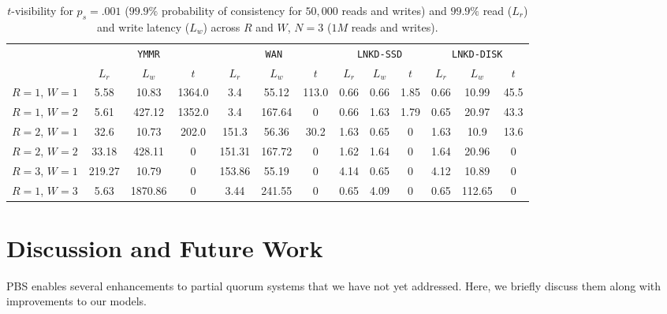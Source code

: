 \documentclass{vldb}
\begin{document}
\begin{table}
\centering
\begin{tabular}{c|c|c|c|c|c|c|c|c|c|c|c|c|}
\cline{2-13}
& \multicolumn{3}{|c|}{\texttt{YMMR}} & \multicolumn{3}{|c|}{\texttt{WAN}} & \multicolumn{3}{|c|}{\texttt{LNKD-SSD}} & \multicolumn{3}{|c|}{\texttt{LNKD-DISK}}\\
&\multicolumn{1}{|c}{$L_r$}  & \multicolumn{1}{c}{$L_w$} & \multicolumn{1}{c|}{$t$} &  \multicolumn{1}{|c}{$L_r$} & \multicolumn{1}{c}{$L_w$} & \multicolumn{1}{c|}{$t$} &  \multicolumn{1}{|c}{$L_r$} & \multicolumn{1}{c}{$L_w$} & \multicolumn{1}{c|}{$t$} &  \multicolumn{1}{|c}{$L_r$} & \multicolumn{1}{c}{$L_w$} & \multicolumn{1}{c|}{$t$} \\\hline
\multicolumn{1}{|c|}{$R$$=$$1$, $W$$=$$1$}
& 5.58 & 10.83 & 1364.0 & 3.4 & 55.12 & 113.0 & 0.66 & 0.66 & 1.85 & 0.66 & 10.99 & 45.5 \\
\multicolumn{1}{|c|}{$R$$=$$1$, $W$$=$$2$}
& 5.61 & 427.12 & 1352.0 & 3.4 & 167.64 & 0 & 0.66 & 1.63 & 1.79 & 0.65 & 20.97 & 43.3 \\
\multicolumn{1}{|c|}{$R$$=$$2$, $W$$=$$1$}
& 32.6 & 10.73 & 202.0 & 151.3 & 56.36 & 30.2 & 1.63 & 0.65 & 0 & 1.63 & 10.9 & 13.6 \\
\multicolumn{1}{|c|}{$R$$=$$2$, $W$$=$$2$}
& 33.18 & 428.11 & 0 & 151.31 & 167.72 & 0 & 1.62 & 1.64 & 0 & 1.64 & 20.96 & 0 \\
\multicolumn{1}{|c|}{$R$$=$$3$, $W$$=$$1$}
& 219.27 & 10.79 & 0 & 153.86 & 55.19 & 0 & 4.14 & 0.65 & 0 & 4.12 & 10.89 & 0 \\
\multicolumn{1}{|c|}{$R$$=$$1$, $W$$=$$3$}
& 5.63 & 1870.86 & 0 & 3.44 & 241.55 & 0 & 0.65 & 4.09 & 0 & 0.65 & 112.65 & 0 \\
\hline
\end{tabular}
\vspace{-4pt}
\caption{$t$-visibility for $p_{s} = .001$ ($99.9\%$ probability
  of consistency for $50,000$ reads and writes) and $99.9\%$ read
  ($L_r$) and write latency ($L_w$) across $R$ and $W$, $N$$=$$3$
  ($1M$ reads and writes).}
\vspace{-12pt}
\label{table:lat-stale}
\end{table}


\section{Discussion and Future Work}
\label{sec:discussion}

PBS enables several enhancements to partial quorum systems that we
have not yet addressed.  Here, we briefly discuss them along with
improvements to our models.
\end{document}
